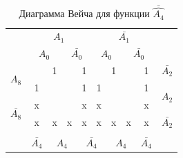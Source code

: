 \documentclass[a4paper,14pt]{article}
\begin{document}
\begin{table}[H]
\begin{minipage}{.5\linewidth}
		\centering
		\caption{Диаграмма Вейча для функции $\bar{\hat{A_4}}$}
		\begin{tabular}{cccccccccc}
			& \multicolumn{4}{c}{$A_1$}                                                                         & \multicolumn{4}{c}{$\bar{A_1}$}                                                                   &                        \\
			& \multicolumn{2}{c}{$A_0$}                       & \multicolumn{2}{c}{$\bar{A_0}$}                 & \multicolumn{2}{c}{$A_0$}                       & \multicolumn{2}{c}{$\bar{A_0}$}                 &                        \\ \cline{2-9}
			\multicolumn{1}{c|}{\multirow{2}{*}{$A_8$}}       & \multicolumn{1}{c|}{}  & \multicolumn{1}{c|}{1} & \multicolumn{1}{c|}{}  & \multicolumn{1}{c|}{1} & \multicolumn{1}{c|}{}  & \multicolumn{1}{c|}{1} & \multicolumn{1}{c|}{}  & \multicolumn{1}{c|}{1} & $\bar{A_2}$            \\ \cline{2-9}
			\multicolumn{1}{c|}{}                             & \multicolumn{1}{c|}{1} & \multicolumn{1}{c|}{}  & \multicolumn{1}{c|}{}  & \multicolumn{1}{c|}{1} & \multicolumn{1}{c|}{1} & \multicolumn{1}{c|}{}  & \multicolumn{1}{c|}{}  & \multicolumn{1}{c|}{1} & \multirow{2}{*}{$A_2$} \\ \cline{2-9}
			\multicolumn{1}{c|}{\multirow{2}{*}{$\bar{A_8}$}} & \multicolumn{1}{c|}{x} & \multicolumn{1}{c|}{}  & \multicolumn{1}{c|}{}  & \multicolumn{1}{c|}{x} & \multicolumn{1}{c|}{x} & \multicolumn{1}{c|}{}  & \multicolumn{1}{c|}{}  & \multicolumn{1}{c|}{x} &                        \\ \cline{2-9}
			\multicolumn{1}{c|}{}                             & \multicolumn{1}{c|}{x} & \multicolumn{1}{c|}{x} & \multicolumn{1}{c|}{x} & \multicolumn{1}{c|}{x} & \multicolumn{1}{c|}{x} & \multicolumn{1}{c|}{x} & \multicolumn{1}{c|}{x} & \multicolumn{1}{c|}{x} & $\bar{A_2}$            \\ \cline{2-9}
			\\
			& $\bar{A_4}$            & \multicolumn{2}{c}{$A_4$}                       & \multicolumn{2}{c}{$\bar{A_4}$}                 & \multicolumn{2}{c}{$A_4$}                       & $\bar{A_4}$            &                       
		\end{tabular}
	\end{minipage} 
\end{table}
\end{document}
